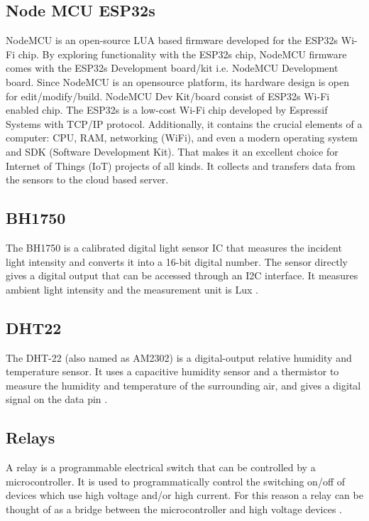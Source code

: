 \documentclass[conference]{IEEEtran}
\begin{document}
\subsection{Node MCU ESP32s}
NodeMCU is an open-source LUA based firmware developed for the ESP32s Wi-Fi chip. By
exploring functionality with the ESP32s chip, NodeMCU firmware comes with the ESP32s
Development board/kit i.e. NodeMCU Development board. Since NodeMCU is an opensource platform, its hardware design is open for edit/modify/build. NodeMCU Dev Kit/board
consist of ESP32s Wi-Fi enabled chip. The ESP32s is a low-cost Wi-Fi chip developed by
Espressif Systems with TCP/IP protocol. Additionally, it contains the crucial elements of a
computer: CPU, RAM, networking (WiFi), and even a modern operating system and SDK (Software Development Kit).
That makes it an excellent choice for Internet of Things (IoT) projects of all kinds. It collects
and transfers data from the sensors to the cloud based server\cite{b4}\cite{b5}.

\subsection{BH1750}
The BH1750 is a calibrated digital light sensor IC that measures the incident light intensity and
converts it into a 16-bit digital number. The sensor directly gives a digital output that can be accessed through an I2C interface. It measures ambient light intensity and the
measurement unit is Lux \cite{b6}.

\subsection{DHT22}
The DHT-22 (also named as AM2302) is a digital-output relative humidity and temperature
sensor. It uses a capacitive humidity sensor and a thermistor to measure the humidity and
temperature of the surrounding air, and gives a digital signal on the data pin \cite{b7}.

\subsection{Relays}
A relay is a programmable electrical switch that can be controlled by a microcontroller. It is
used to programmatically control the switching on/off of devices which use high voltage and/or
high current. For this reason a relay can be thought of as a bridge between the microcontroller
and high voltage devices \cite{b8}.
\end{document}
